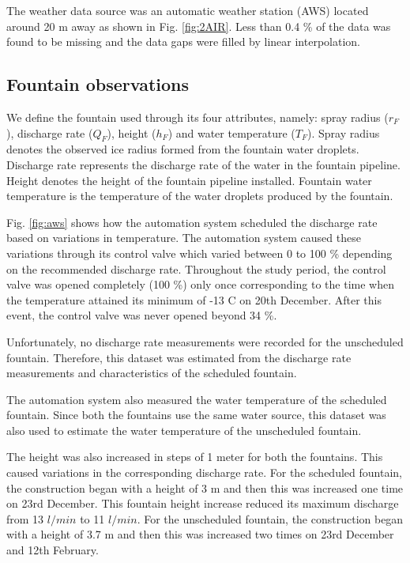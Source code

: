 \documentclass[tc, manuscript]{copernicus}
\begin{document}
The weather data source was an automatic weather station (AWS) located around 20 m away as shown in Fig.
\ref{fig:2AIR}. Less than 0.4 \% of the data was found to be missing and the data gaps were filled by linear
interpolation. 

\subsection{Fountain observations}

We define the fountain used through its four attributes, namely: spray radius ($r_F$), discharge rate ($Q_F$),
height ($h_F$) and water temperature ($T_F$). Spray radius denotes the observed ice radius formed from the
fountain water droplets. Discharge rate represents the discharge rate of the water in the fountain pipeline.
Height denotes the height of the fountain pipeline installed. Fountain water temperature is the temperature of
the water droplets produced by the fountain.

Fig. \ref{fig:aws} shows how the automation system scheduled the discharge rate based on variations in
temperature. The automation system caused these variations through its control valve which varied between 0 to
100 \% depending on the recommended discharge rate. Throughout the study period, the control valve was opened
completely (100 \%) only once corresponding to the time when the temperature attained its minimum of -13 \degree
C on 20th December. After this event, the control valve was never opened beyond 34 \%.  

Unfortunately, no discharge rate measurements were recorded for the unscheduled fountain. Therefore, this
dataset was estimated from the discharge rate measurements and characteristics of the scheduled fountain.

The automation system also measured the water temperature of the scheduled fountain. Since both the fountains
use the same water source, this dataset was also used to estimate the water temperature of the unscheduled
fountain.

The height was also increased in steps of 1 meter for both the fountains. This caused variations in the
corresponding discharge rate. For the scheduled fountain, the construction began with a height of 3 m and then
this was increased one time on 23rd December. This fountain height increase reduced its maximum discharge from
13 $l/min$ to 11 $l/min$. For the unscheduled fountain, the construction began with a height of 3.7 m and then
this was increased two times on 23rd December and 12th February.  
\end{document}
